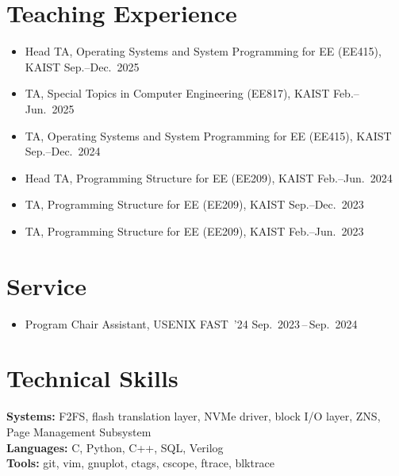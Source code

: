 \documentclass[11pt,a4paper]{article}
\begin{document}
\section{Teaching Experience}
\begin{itemize}[leftmargin=1.2em, nosep, itemsep=4pt]
  \item Head TA, Operating Systems and System Programming for EE (EE415),
        KAIST \hfill Sep.--Dec.\ 2025
  \item TA, Special Topics in Computer Engineering (EE817),
        KAIST \hfill Feb.--Jun.\ 2025
  \item TA, Operating Systems and System Programming for EE (EE415),
        KAIST \hfill Sep.--Dec.\ 2024
  \item Head TA, Programming Structure for EE (EE209),
        KAIST \hfill Feb.--Jun.\ 2024
  \item TA, Programming Structure for EE (EE209),
        KAIST \hfill Sep.--Dec.\ 2023
  \item TA, Programming Structure for EE (EE209),
        KAIST \hfill Feb.--Jun.\ 2023
\end{itemize}

\section{Service}
\begin{itemize}[leftmargin=1.2em, nosep, itemsep=4pt]
  \item Program Chair Assistant, USENIX FAST~'24 \hfill Sep.\ 2023\,--\,Sep.\ 2024
\end{itemize}

\section{Technical Skills}
\textbf{Systems:} F2FS, flash translation layer, NVMe driver,
block I/O layer, ZNS, Page Management Subsystem \\
\textbf{Languages:} C, Python, C++, SQL, Verilog \\
\textbf{Tools:} git, vim, gnuplot, ctags, cscope, ftrace, blktrace

\end{document}
